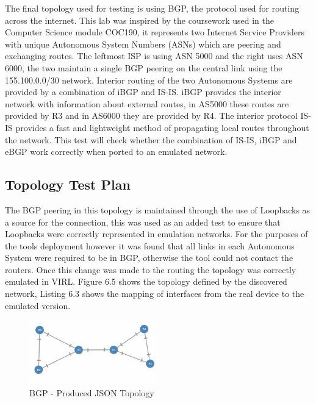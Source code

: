 \documentclass[11pt]{report}
\begin{document}
The final topology used for testing is using BGP, the protocol used for routing across the internet. This lab was inspired by the coursework used in the Computer Science module COC190, it represents two Internet Service Providers with unique Autonomous System Numbers (ASNs) which are peering and exchanging routes. The leftmost ISP is using ASN 5000 and the right uses ASN 6000, the two maintain a single BGP peering on the central link using the 155.100.0.0/30 network. Interior routing of the two Autonomous Systems are provided by a combination of iBGP and IS-IS. iBGP provides the interior network with information about external routes, in AS5000 these routes are provided by R3 and in AS6000 they are provided by R4. The interior protocol IS-IS provides a fast and lightweight method of propagating local routes throughout the network. This test will check whether the combination of IS-IS, iBGP and eBGP work correctly when ported to an emulated network.

\subsection{Topology Test Plan}

The BGP peering in this topology is maintained through the use of Loopbacks as a source for the connection, this was used as an added test to ensure that Loopbacks were correctly represented in emulation networks.  For the purposes of the tools deployment however it was found that all links in each Autonomous System were required to be in BGP, otherwise the tool could not contact the routers. Once this change was made to the routing the topology was correctly emulated in VIRL. Figure 6.5 shows the topology defined by the discovered network, Listing 6.3 shows the mapping of interfaces from the real device to the emulated version.

\FloatBarrier
\begin{figure}[h!]
	\caption{BGP - Produced JSON Topology}
	\centering
	\begin{center}
		\includegraphics[width=0.5\textwidth]{BGP-Web.png}
	\end{center}
\end{figure}
\FloatBarrier
\end{document}
